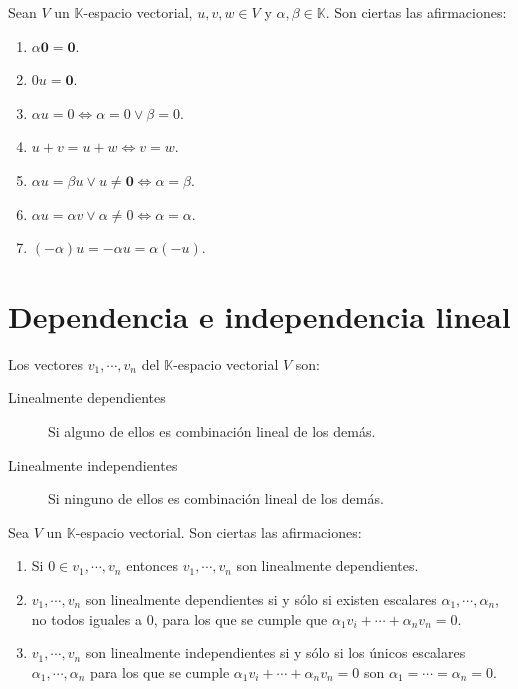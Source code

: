 \begin{prop}
	Sean $V$ un $\mathbb{K}$-espacio vectorial, $u,v,w \in V$ y $\alpha,\beta \in \mathbb{K}$. Son ciertas las afirmaciones:
	\begin{enumerate}
		\item $\alpha\textbf{0}=\textbf{0}$.
		\item $0u=\textbf{0}$.
		\item $\alpha u = 0 \Leftrightarrow \alpha = 0 \vee \beta = 0$.
		\item $u+v=u+w \Leftrightarrow v=w$.
		\item $\alpha u = \beta u \vee u \neq \textbf{0} \Leftrightarrow \alpha = \beta$.
		\item $\alpha u = \alpha v \vee \alpha \neq 0 \Leftrightarrow \alpha = \alpha$.
		\item $(-\alpha)u=-\alpha u = \alpha(-u)$.		
	\end{enumerate}
\end{prop}

\section{Dependencia e independencia lineal}

\begin{defi}
	Los vectores $v_1,\cdots,v_n$ del $\mathbb{K}$-espacio vectorial $V$ son:
	\begin{description}
		\item[Linealmente dependientes] Si alguno de ellos es combinación lineal de los demás.
		\item[Linealmente independientes] Si ninguno de ellos es combinación lineal de los demás.		
	\end{description}
\end{defi}

\begin{prop}
	Sea $V$ un $\mathbb{K}$-espacio vectorial. Son ciertas las afirmaciones:
	\begin{enumerate}
	\item Si $0 \in {v_1,\cdots,v_n}$ entonces $v_1,\cdots,v_n$ son linealmente dependientes.
	\item $v_1,\cdots,v_n$ son linealmente dependientes si y sólo si existen escalares $\alpha_1,\cdots,\alpha_n$, no todos iguales a 0, para los que se cumple que $\alpha_1 v_i + \cdots + \alpha_n v_n = 0$.
	\item $v_1,\cdots,v_n$ son linealmente independientes si y sólo si los únicos escalares $\alpha_1,\cdots,\alpha_n$ para los que se cumple $\alpha_1 v_i + \cdots + \alpha_n v_n = 0$ son $\alpha_1=\cdots=\alpha_n=0$.
	\end{enumerate}
\end{prop}

